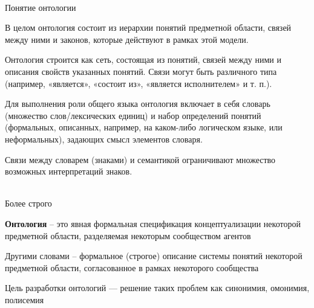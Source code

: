 \begin{frame}{\\Понятие онтологии}
	\topline
	\justifying
	
	\vspace{2em}
	В целом онтология состоит из иерархии понятий предметной области, связей между ними и законов, которые действуют в рамках этой модели.
	
	\vspace{0.5em}
	Онтология строится как сеть, состоящая из понятий, связей между ними и описания свойств указанных понятий. Связи могут быть различного типа (например, «является», «состоит из», «является исполнителем» и т. п.).
	
	\vspace{0.5em}
	Для выполнения роли общего языка онтология включает в себя словарь (множество слов/лексических единиц) и набор определений понятий (формальных, описанных, например, на каком-либо логическом языке, или неформальных), задающих смысл элементов словаря.
	
	\vspace{0.5em}
	Связи между словарем (знаками) и семантикой ограничивают множество возможных интерпретаций знаков.
	
\end{frame}

\begin{frame}{\\Более строго}
	\topline
	\justifying
	
	\begin{textitemize}
		\item \textbf{Онтология} -- это явная формальная спецификация концептуализации некоторой предметной области, разделяемая некоторым сообществом агентов
		\begin{textitemize}
			\item Другими словами -- формальное (строгое) описание системы понятий некоторой предметной области, согласованное в рамках некоторого сообщества
			\item Цель разработки онтологий --- решение таких проблем как синонимия, омонимия, полисемия
		\end{textitemize}
	\end{textitemize}
	
\end{frame}

